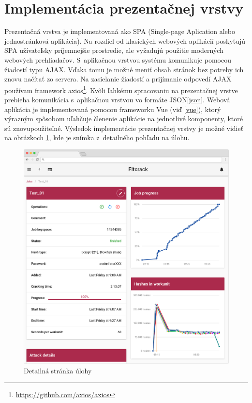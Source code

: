 \documentclass[slovak]{fitthesis}
\begin{document}
\section{Implementácia prezentačnej vrstvy}


Prezentačná vrstva je implementovaná ako SPA (Single-page Aplication alebo jednostránková aplikácia). Na rozdiel od klasických webových aplikácií poskytujú SPA užívateľsky príjemnejšie prostredie, ale vyžadujú použitie moderných webových prehliadačov. S~aplikačnou vrstvou systému komunikuje pomocou žiadostí typu AJAX. Vďaka tomu je možné meniť obsah stránok bez potreby ich znovu načítať zo servera. Na zasielanie žiadostí a prijímanie odpovedí AJAX používam framework axios\footnote{\url{https://github.com/axios/axios}}. Kvôli ľahkému spracovaniu na prezentačnej vrstve prebieha komunikácia s~aplikačnou vrstvou vo formáte JSON\ref{json}. Webová aplikácia je implementovaná pomocou frameworku Vue (viď \ref{vue}), ktorý výrazným spôsobom uľahčuje členenie aplikácie na jednotlivé komponenty, ktoré sú znovupoužiteľné. Výsledok implementácie prezentačnej vrstvy je možné vidieť na obrázkoch \ref{fig:detailPage}, kde je snímka z~detailného pohľadu na úlohu.
\begin{figure}[H]
    \centering
    \includegraphics[scale=0.25]{obrazky/jobDetail2Frame.PNG}
    \caption{Detailná stránka úlohy}
    \label{fig:detailPage}
\end{figure}
\end{document}
